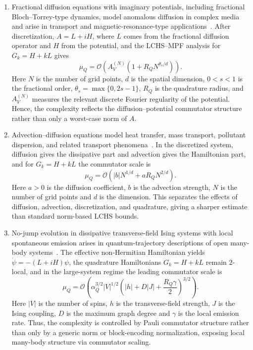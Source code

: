 \documentclass[10pt,reqno]{article}
\numberwithin{equation}{section}
\theoremstyle{plain}
\theoremstyle{definition}
\begin{document}
\begin{enumerate}
    \item Fractional diffusion equations with imaginary potentials, including fractional Bloch--Torrey-type dynamics, model anomalous diffusion in complex media and arise in transport and magnetic-resonance-type applications~\cite{Torrey1956,Magin2008,Yu2013,BuenoOrovioBurrage2017,Moutal2020}. After discretization, $A=L+iH$, where $L$ comes from the fractional diffusion operator and $H$ from the potential, and the LCHS--MPF analysis for $G_k=H+kL$ gives
    \begin{equation}
        \mu_Q=\mathcal{O} (A_V^{(N)} (1+R_QN^{\theta_s/d} ) ).
    \end{equation}
    Here $N$ is the number of grid points, $d$ is the spatial dimension, $0<s<1$ is the fractional order, $\theta_s=\max\{0,2s-1\}$, $R_Q$ is the quadrature radius, and $A_V^{(N)}$ measures the relevant discrete Fourier regularity of the potential. Hence, the complexity reflects the diffusion--potential commutator structure rather than only a worst-case norm of $A$.

    \item Advection--diffusion equations model heat transfer, mass transport, pollutant dispersion, and related transport phenomena~\cite{ParhiziEtAlCDRS,AgudAlbesaEtAlCDR,VillotaCadenaEtAlCDRSolv,an2026fast}. In the discretized system, diffusion gives the dissipative part and advection gives the Hamiltonian part, and for $G_k=H+kL$ the commutator scale is
    \begin{equation}
        \mu_Q=\mathcal{O} (|b|N^{1/d}+aR_QN^{2/d} ).
    \end{equation}
    Here $a>0$ is the diffusion coefficient, $b$ is the advection strength, $N$ is the number of grid points and $d$ is the dimension. This separates the effects of diffusion, advection, discretization, and quadrature, giving a sharper estimate than standard norm-based LCHS bounds.

    \item No-jump evolution in dissipative transverse-field Ising systems with local spontaneous emission arises in quantum-trajectory descriptions of open many-body systems~\cite{DalibardCastinMolmer1992,PlenioKnight1998,LeeChan2013,RobertsClerk2023}. The effective non-Hermitian Hamiltonian yields $\dot{\psi}=-(L+iH)\psi$, the quadrature Hamiltonians $G_k=H+kL$ remain $2$-local, and in the large-system regime the leading commutator scale is
    \begin{equation}
\mu_Q=\mathcal{O} \left( \alpha_Q^{3/2}|V|^{1/2}\left(|h|+D|J|+\frac{R_Q\gamma}{2}\right)^{3/2}\right).
    \end{equation}
    Here $|V|$ is the number of spins, $h$ is the transverse-field strength, $J$ is the Ising coupling, $D$ is the maximum graph degree and  $\gamma$ is the local emission rate. Thus, the complexity is controlled by Pauli commutator structure rather than only by a generic norm or block-encoding normalization, exposing local many-body structure via commutator scaling.
\end{enumerate}
\end{document}
